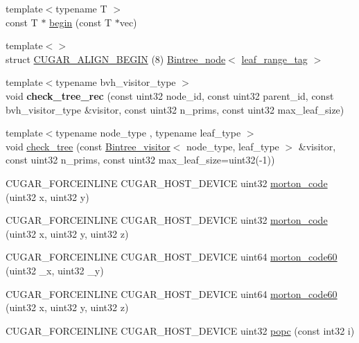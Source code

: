 \begin{DoxyCompactItemize}
{\footnotesize template$<$typename T $>$ }\\const T $\ast$ \hyperlink{group___basic_gab258fa2242425e638b3014c9ce667ed5}{begin} (const T $\ast$vec)
\item 
{\footnotesize template$<$$>$ }\\struct \hyperlink{group__bintree_ga15f38b4f0c951aae051440621b067dae}{C\+U\+G\+A\+R\+\_\+\+A\+L\+I\+G\+N\+\_\+\+B\+E\+G\+IN} (8) \hyperlink{structcugar_1_1_bintree__node}{Bintree\+\_\+node}$<$ \hyperlink{structcugar_1_1leaf__range__tag}{leaf\+\_\+range\+\_\+tag} $>$
\item 
{\footnotesize template$<$typename bvh\+\_\+visitor\+\_\+type $>$ }\\void {\bfseries check\+\_\+tree\+\_\+rec} (const uint32 node\+\_\+id, const uint32 parent\+\_\+id, const bvh\+\_\+visitor\+\_\+type \&visitor, const uint32 n\+\_\+prims, const uint32 max\+\_\+leaf\+\_\+size)
\item 
{\footnotesize template$<$typename node\+\_\+type , typename leaf\+\_\+type $>$ }\\void \hyperlink{group__bintree_ga70e603ed21666cc3c7fc15fde631c356}{check\+\_\+tree} (const \hyperlink{structcugar_1_1_bintree__visitor}{Bintree\+\_\+visitor}$<$ node\+\_\+type, leaf\+\_\+type $>$ \&visitor, const uint32 n\+\_\+prims, const uint32 max\+\_\+leaf\+\_\+size=uint32(-\/1))
\item 
C\+U\+G\+A\+R\+\_\+\+F\+O\+R\+C\+E\+I\+N\+L\+I\+NE C\+U\+G\+A\+R\+\_\+\+H\+O\+S\+T\+\_\+\+D\+E\+V\+I\+CE uint32 \hyperlink{group___bits_module_ga6494ab687521f35e3e28dc1524d15218}{morton\+\_\+code} (uint32 x, uint32 y)
\item 
C\+U\+G\+A\+R\+\_\+\+F\+O\+R\+C\+E\+I\+N\+L\+I\+NE C\+U\+G\+A\+R\+\_\+\+H\+O\+S\+T\+\_\+\+D\+E\+V\+I\+CE uint32 \hyperlink{group___bits_module_ga4b9f4b0383537e421a0c7299ca64d76e}{morton\+\_\+code} (uint32 x, uint32 y, uint32 z)
\item 
C\+U\+G\+A\+R\+\_\+\+F\+O\+R\+C\+E\+I\+N\+L\+I\+NE C\+U\+G\+A\+R\+\_\+\+H\+O\+S\+T\+\_\+\+D\+E\+V\+I\+CE uint64 \hyperlink{group___bits_module_ga849b7e23fee1b2d3b573469a983cac3d}{morton\+\_\+code60} (uint32 \+\_\+x, uint32 \+\_\+y)
\item 
C\+U\+G\+A\+R\+\_\+\+F\+O\+R\+C\+E\+I\+N\+L\+I\+NE C\+U\+G\+A\+R\+\_\+\+H\+O\+S\+T\+\_\+\+D\+E\+V\+I\+CE uint64 \hyperlink{group___bits_module_ga341afe20927dde33979a1d6720d26569}{morton\+\_\+code60} (uint32 x, uint32 y, uint32 z)
\item 
C\+U\+G\+A\+R\+\_\+\+F\+O\+R\+C\+E\+I\+N\+L\+I\+NE C\+U\+G\+A\+R\+\_\+\+H\+O\+S\+T\+\_\+\+D\+E\+V\+I\+CE uint32 \hyperlink{group___bits_module_ga88a87094ba5547f8896d8947adfdec58}{popc} (const int32 i)

\end{DoxyCompactItemize}
